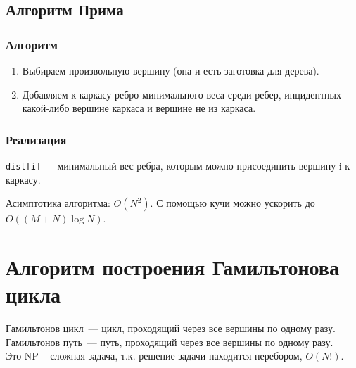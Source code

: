 \subsection{Алгоритм Прима}
\subsubsection{Алгоритм}
\begin{enumerate}
	\item Выбираем произвольную вершину (она и есть заготовка для дерева).
	\item Добавляем к каркасу ребро минимального веса среди ребер, инцидентных какой-либо вершине каркаса и вершине не из каркаса.
\end{enumerate}
\subsubsection{Реализация}
\texttt{dist[i]} --- минимальный вес  ребра, которым можно присоединить вершину i к каркасу.
Асимптотика алгоритма: $O(N^2)$. С помощью кучи можно ускорить до $O((M+N)\log N)$.
\section{Алгоритм построения Гамильтонова цикла}
Гамильтонов цикл~--- цикл, проходящий через все вершины по одному разу.
Гамильтонов путь~--- путь, проходящий через все вершины по одному разу.\\
Это NP -- сложная задача, т.к. решение задачи находится перебором, $O(N!)$.
